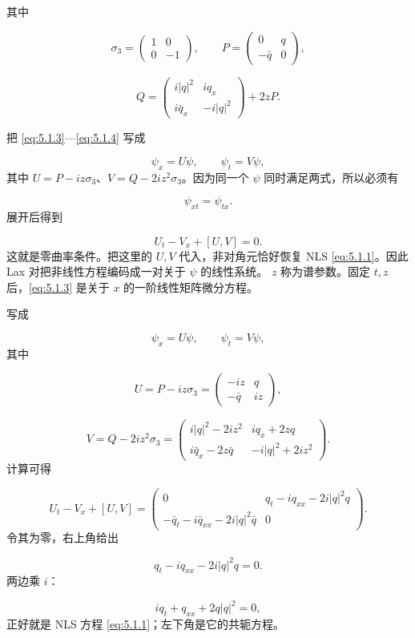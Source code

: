 \documentclass[
    lang=cn,
    scheme=chinese,
    mode=simple,
    device=normal,
    color=blue,
    math=cm,
    thmcnt=section,
    12pt,
    nowatermark
]{elegantbook}
\begin{document}
其中

\[
    \sigma_3=
    \begin{pmatrix}
        1 & 0  \\
        0 & -1
    \end{pmatrix},
    \qquad
    P=
    \begin{pmatrix}
        0       & q \\
        -\bar q & 0
    \end{pmatrix},
\]

\[
    Q=
    \begin{pmatrix}
        i\lvert q\rvert^2 & iq_x               \\
        i\bar q_x         & -i\lvert q\rvert^2
    \end{pmatrix}
    +2zP.
\]

\begin{callout}
    把 \eqref{eq:5.1.3}---\eqref{eq:5.1.4} 写成

    \[
        \psi_x=U\psi,\qquad \psi_t=V\psi,
    \]
    其中 $U=P-iz\sigma_3$、$V=Q-2iz^2\sigma_3$。因为同一个 $\psi$ 同时满足两式，所以必须有

    \[
        \psi_{xt}=\psi_{tx}.
    \]
    展开后得到

    \[
        U_t-V_x+[U,V]=0.
    \]
    这就是零曲率条件。把这里的 $U,V$ 代入，非对角元恰好恢复 NLS \eqref{eq:5.1.1}。因此 Lax 对把非线性方程编码成一对关于 $\psi$ 的线性系统。
    $z$ 称为谱参数。固定 $t,z$ 后，\eqref{eq:5.1.3} 是关于 $x$ 的一阶线性矩阵微分方程。
\end{callout}

\begin{callout}
    写成

    \[
        \psi_x=U\psi,\qquad
        \psi_t=V\psi,
    \]
    其中

    \[
        U=
        P-iz\sigma_3
        =
        \begin{pmatrix}
            -iz     & q  \\
            -\bar q & iz
        \end{pmatrix},
    \]

    \[
        V=
        Q-2iz^2\sigma_3
        =
        \begin{pmatrix}
            i|q|^2-2iz^2       & iq_x+2zq      \\
            i\bar q_x-2z\bar q & -i|q|^2+2iz^2
        \end{pmatrix}.
    \]
    计算可得

    \[
        U_t-V_x+[U,V]
        =
        \begin{pmatrix}
            0                                    &
            q_t-iq_{xx}-2i|q|^2q                   \\
            -\bar q_t-i\bar q_{xx}-2i|q|^2\bar q &
            0
        \end{pmatrix}.
    \]
    令其为零，右上角给出

    \[
        q_t-iq_{xx}-2i|q|^2q=0.
    \]
    两边乘 $i$：

    \[
        iq_t+q_{xx}+2q|q|^2=0,
    \]
    正好就是 NLS 方程 \eqref{eq:5.1.1}；左下角是它的共轭方程。
\end{callout}
\end{document}
